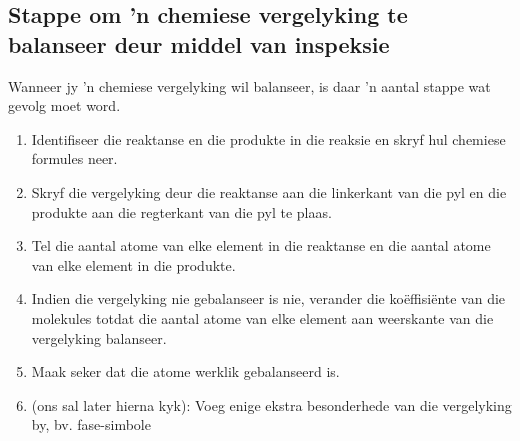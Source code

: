             \subsection*{Stappe om 'n chemiese vergelyking te balanseer deur middel van inspeksie}
            \nopagebreak
Wanneer jy 'n chemiese vergelyking wil balanseer, is daar 'n aantal stappe wat gevolg moet word.
        \label{m38726*id63712}\begin{enumerate}[noitemsep, label=\textbf{Stap \arabic*}:]
\item Identifiseer die reaktanse en die produkte in die reaksie en skryf hul chemiese formules neer.
\item Skryf die vergelyking deur die reaktanse aan die linkerkant van die pyl en die produkte aan die regterkant van die pyl te plaas.
\item Tel die aantal atome van elke element in die reaktanse en die aantal atome van elke element in die produkte.
\item Indien die vergelyking nie gebalanseer is nie, verander die koëffisiënte van die molekules totdat die aantal atome van elke element aan weerskante van die vergelyking balanseer.
\item Maak seker dat die atome werklik gebalanseerd is.
\item (ons sal later hierna kyk): Voeg enige ekstra besonderhede van die vergelyking by, bv. fase-simbole
\end{enumerate}
\par
            \label{m38726*secfhsst!!!underscore!!!id296}
      \noindent

